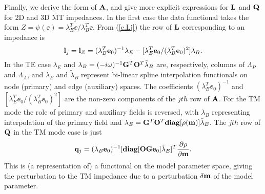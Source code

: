 Finally, we derive the form of ${\bf A}$, and give more explicit
expressions for
${\bf L}$ and ${\bf Q}$ for 2D and 3D MT impedances.
In the first case the data functional takes the form
$Z = \psi(\ee) =  \lambda_E^T\ee / \lambda_B^T\ee$.  From (\ref{e.Lj})
the row of ${\bf L}$ corresponding to an impedance is
\begin{equation}
\label{e.LZ}
{\bf l}_j = {\bf l}_Z = (\lambda_B^T {\bf e}_0)^{-1} \lambda_E - 
[ \lambda_E^T {\bf e}_0 / (\lambda_B^T {\bf e}_0 )^2] \lambda_B .
\end{equation}
In the TE case $\lambda_E$ and $\lambda_B = (-i\omega)^{-1}
{\bf G}^T{\bf O}^T \tilde \lambda_B$ are, respectively,
columns of $\Lambda_P$ and $\Lambda_A$, 
and $\lambda_E$ and $\tilde \lambda_B$
represent bi-linear spline interpolation
functionals on node (primary) and edge (auxiliary) spaces.
The coefficients $(\lambda_B^T \ee_0)^{-1}$ and
$[ \lambda_E^T \ee_0 / (\lambda_B^T \ee_0 )^2]$ are
the non-zero components of the $jth$ row of ${\bf A}$.
For the TM mode the role of primary and
auxiliary fields is reversed, 
with $\lambda_B$ representing interpolation of the
primary field and $\lambda_E = {\bf G}^T{\bf O}^T{\bf diag}[ \rho ({\bf m}) ]
\tilde\lambda_E$.
The $jth$ row of ${\bf Q}$ in the TM mode case is just
\begin{equation}
\label{e.QZ_TM}
{\bf q}_j = (\lambda_B {\bf e}_0)^{-1} [ {\bf diag}[ {\bf O} {\bf G} {\bf e}_0]
\tilde \lambda_E ]^T \frac{\partial\rho}{\partial{\bf m}}.
\end{equation}
This is (a representation of)
a functional on the model parameter space, giving the
perturbation to the TM impedance due to a perturbation $\delta {\bf m}$
of the model parameter.

